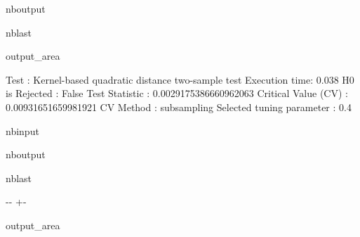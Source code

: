 \documentclass[letterpaper,10pt,english,openany,oneside]{sphinxmanual}
\begin{document}
{{{{\begin{sphinxuseclass}{nboutput}
\begin{sphinxuseclass}{nblast}
{
\begin{sphinxuseclass}{output_area}
\begin{sphinxuseclass}{}


\begin{sphinxVerbatim}[commandchars=\\\{\}]
Test : Kernel-based quadratic distance two-sample test
Execution time: 0.038
H0 is Rejected : False
Test Statistic : 0.0029175386660962063
Critical Value (CV) : 0.00931651659981921
CV Method : subsampling
Selected tuning parameter : 0.4
\end{sphinxVerbatim}



\end{sphinxuseclass}
\end{sphinxuseclass}
}

\end{sphinxuseclass}
\end{sphinxuseclass}
\begin{sphinxuseclass}{nbinput}
{
\begin{sphinxVerbatim}[commandchars=\\\{\}]
\llap{\color{nbsphinxin}[8]:\,\hspace{\fboxrule}\hspace{\fboxsep}}
\end{sphinxVerbatim}
}

\end{sphinxuseclass}
\begin{sphinxuseclass}{nboutput}
\begin{sphinxuseclass}{nblast}
{

\kern-\sphinxverbatimsmallskipamount\kern-\baselineskip
\kern+\FrameHeightAdjust\kern-\fboxrule
\vspace{\nbsphinxcodecellspacing}

\begin{sphinxuseclass}{output_area}
\begin{sphinxuseclass}{}



\end{sphinxuseclass}
\end{sphinxuseclass}}
\end{sphinxuseclass}
\end{sphinxuseclass}}}}}
\end{document}
